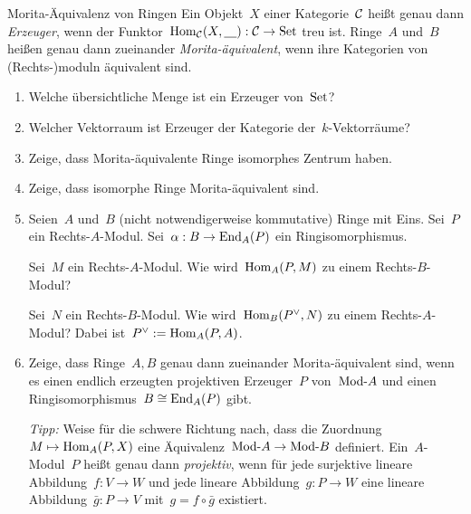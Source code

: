 \documentclass{uebblatt}
\begin{document}
\begin{aufgabe}{Morita-Äquivalenz von Ringen
}
Ein Objekt~$X$ einer Kategorie~$\mathcal{C}$ heißt genau dann \emph{Erzeuger}, wenn der
Funktor~$\mathrm{Hom}_{\mathcal{C}}(X, \underline{\quad}) : \mathcal{C} \to \mathrm{Set}$ treu ist. Ringe~$A$
und~$B$ heißen genau dann zueinander \emph{Morita-äquivalent}, wenn ihre
Kategorien von (Rechts-)moduln äquivalent sind.

\begin{enumerate}
\item Welche übersichtliche Menge ist ein Erzeuger von~$\mathrm{Set}$?
\item Welcher Vektorraum ist Erzeuger der Kategorie der~$k$-Vektorräume?
\item Zeige, dass Morita-äquivalente Ringe isomorphes Zentrum haben.
\item Zeige, dass isomorphe Ringe Morita-äquivalent sind.
\item Seien~$A$ und~$B$ (nicht notwendigerweise kommutative) Ringe mit Eins.
Sei~$P$ ein Rechts-$A$-Modul. Sei~$\alpha : B \to \mathrm{End}_A(P)$ ein
Ringisomorphismus.

Sei~$M$ ein Rechts-$A$-Modul. Wie wird~$\mathrm{Hom}_A(P,M)$ zu einem Rechts-$B$-Modul?

Sei~$N$ ein Rechts-$B$-Modul. Wie wird~$\mathrm{Hom}_B(P^\vee,N)$ zu einem
Rechts-$A$-Modul? Dabei ist~$P^\vee := \mathrm{Hom}_A(P,A)$.

\item Zeige, dass Ringe~$A,B$ genau dann zueinander Morita-äquivalent sind,
wenn es einen endlich erzeugten projektiven Erzeuger~$P$ von~$\mathrm{Mod}\text{-}A$ und
einen Ringisomorphismus~$B \cong \mathrm{End}_A(P)$ gibt.

\emph{Tipp:} Weise für die schwere Richtung nach, dass die Zuordnung~$M \mapsto
\mathrm{Hom}_A(P,X)$ eine Äquivalenz~$\mathrm{Mod}\text{-}A \to \mathrm{Mod}\text{-}B$ definiert.
Ein~$A$-Modul~$P$ heißt genau dann \emph{projektiv}, wenn für jede surjektive lineare
Abbildung~$f : V \to W$ und jede lineare Abbildung~$g : P \to W$ eine lineare
Abbildung~$\bar g : P \to V$ mit~$g = f \circ \bar g$ existiert.
\end{enumerate}
\end{aufgabe}
\end{document}
